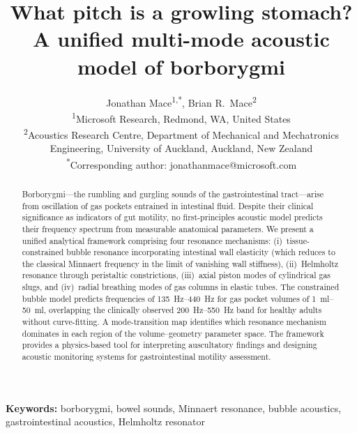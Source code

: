 \documentclass[12pt]{article}
\begin{document}
\title{What pitch is a growling stomach? A unified multi-mode acoustic model of borborygmi}

\author{%
  Jonathan Mace\textsuperscript{1,*},
  Brian R.\ Mace\textsuperscript{2}\\[4pt]
  \small \textsuperscript{1}Microsoft Research, Redmond, WA, United States\\
  \small \textsuperscript{2}Acoustics Research Centre, Department of Mechanical and
         Mechatronics Engineering, University of Auckland, Auckland, New Zealand\\[2pt]
  \small \textsuperscript{*}Corresponding author: jonathanmace@microsoft.com%
}

\date{}

\maketitle

\begin{abstract}
Borborygmi---the rumbling and gurgling sounds of the gastrointestinal
tract---arise from oscillation of gas pockets entrained in intestinal fluid.
Despite their clinical significance as indicators of gut motility, no
first-principles acoustic model predicts their frequency spectrum from
measurable anatomical parameters.  We present a unified analytical framework
comprising four resonance mechanisms: (i)~tissue-constrained bubble
resonance incorporating intestinal wall elasticity (which reduces to the
classical Minnaert frequency in the limit of vanishing wall stiffness),
(ii)~Helmholtz resonance through peristaltic constrictions,
(iii)~axial piston modes of cylindrical gas slugs, and (iv)~radial breathing
modes of gas columns in elastic tubes.  The constrained bubble model predicts
frequencies of \SIrange{135}{440}{\hertz} for gas pocket volumes of
\SIrange{1}{50}{\milli\litre}, overlapping the clinically observed
\SIrange{200}{550}{\hertz} band for healthy adults without curve-fitting.
A mode-transition map identifies which resonance mechanism dominates in each
region of the volume--geometry parameter space.  The framework provides a
physics-based tool for interpreting auscultatory findings and designing acoustic
monitoring systems for gastrointestinal motility assessment.
\end{abstract}

\noindent\textbf{Keywords:} borborygmi, bowel sounds, Minnaert resonance, bubble acoustics,
gastrointestinal acoustics, Helmholtz resonator
\end{document}
